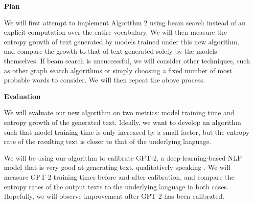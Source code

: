 \documentclass[12pt]{extarticle}
\begin{document}
{\large \textbf{Plan}}

We will first attempt to implement Algorithm 2 using beam search instead of an explicit computation over the entire vocabulary. We will then measure the entropy growth of text generated by models trained under this new algorithm, and compare the growth to that of text generated solely by the models themselves. If beam search is unsuccessful, we will consider other techniques, such as other graph search algorithms or simply choosing a fixed number of most probable words to consider. We will then repeat the above process.

{\large \textbf{Evaluation}}

We will evaluate our new algorithm on two metrics: model training time and entropy growth of the generated text. Ideally, we want to develop an algorithm such that model training time is only increased by a small factor, but the entropy rate of the resulting text is closer to that of the underlying language. 

We will be using our algorithm to calibrate GPT-2, a deep-learning-based NLP model that is very good at generating text, qualitatively speaking \cite{radford2019language}. We will measure GPT-2 training times before and after calibration, and compare the entropy rates of the output texts to the underlying language in both cases. Hopefully, we will observe improvement after GPT-2 has been calibrated.



\end{document}
